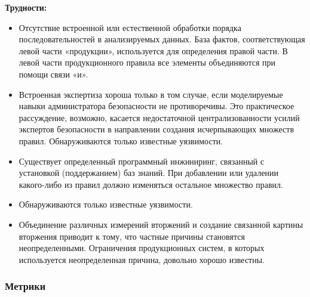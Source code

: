 \textbf{Трудности:}
\begin{itemize}
    \item Отсутствие встроенной или естественной обработки порядка последовательностей в анализируемых
    данных. База фактов, соответствующая левой части «продукции», используется для определения правой
    части. В левой части продукционного правила все элементы объединяются при помощи связи «и».
    \item Встроенная экспертиза хороша только в том случае, если моделируемые навыки администратора
    безопасности не противоречивы. Это практическое рассуждение, возможно, касается
    недостаточной централизованности усилий экспертов безопасности в направлении создания
    исчерпывающих множеств правил. Обнаруживаются только известные уязвимости.
    \item Существует определенный программный инжиниринг, связанный с установкой (поддержанием) баз знаний.
    При добавлении или удалении какого-либо из правил должно изменяться остальное множество правил.
    \item Обнаруживаются только известные уязвимости.
    \item Объединение различных измерений вторжений и создание связанной картины вторжения приводит к
    тому, что частные причины становятся неопределенными. Ограничения продукционных систем, в
    которых используется неопределенная причина, довольно хорошо известны.
\end{itemize}
\autocite{BeynonDavies}



\subsubsection{Метрики}

